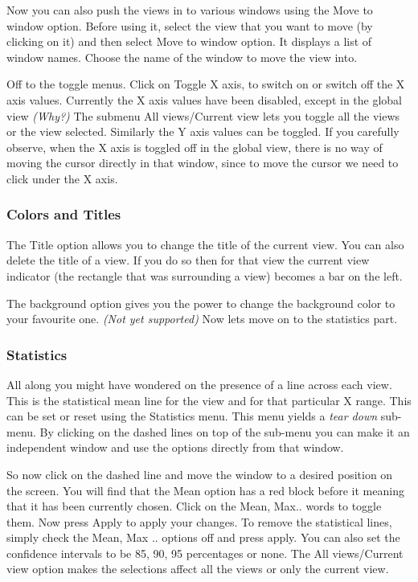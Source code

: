 	
	Now you can also push the views in to various windows using the Move to window option. Before using it, select the view that you want to move (by clicking on it) and then select Move to window option. It displays a list of window names. Choose the name of the window to move the view into.


	Off to the toggle menus. Click on Toggle X axis, to switch on or switch off the X axis values. Currently the X axis values have been disabled, except in the global view {\em (Why?) } The submenu All views/Current view lets you toggle all the views or the view selected. Similarly the Y axis values can be toggled. If you carefully observe, when the X axis is toggled off in the global view, there is no way of moving the cursor directly in that window, since to move the cursor we need to click under the X axis. 

\subsubsection{Colors and Titles}


	The Title option allows you to change the title of the current view. You can also  delete the title of a view. If you do so then for that view the current view indicator (the rectangle that was surrounding a view) becomes a bar on the left.


	The background option gives you the power to change the background color to your favourite one. {\em (Not yet supported) } Now lets move on to the statistics part.


\subsubsection{Statistics}


	All along you might have wondered on the presence of a line across each view. This is the statistical mean line for the view and for that particular X range. This can be set or reset using the Statistics menu. This menu yields a {\em tear down } sub-menu. By clicking on the dashed lines on top of the sub-menu you can make it an independent window and use the options directly from that window.

	So now click on the dashed line and move the window to a desired position on the screen. You will find that the Mean option has a red block before it meaning that it has been currently chosen. Click on the Mean, Max.. words to toggle them. Now press Apply to apply your changes. To remove the statistical lines, simply check the Mean, Max .. options off and press apply. You can also set the confidence intervals to be 85, 90, 95 percentages or none. The All views/Current view option makes the selections affect all the views or only the current view.


